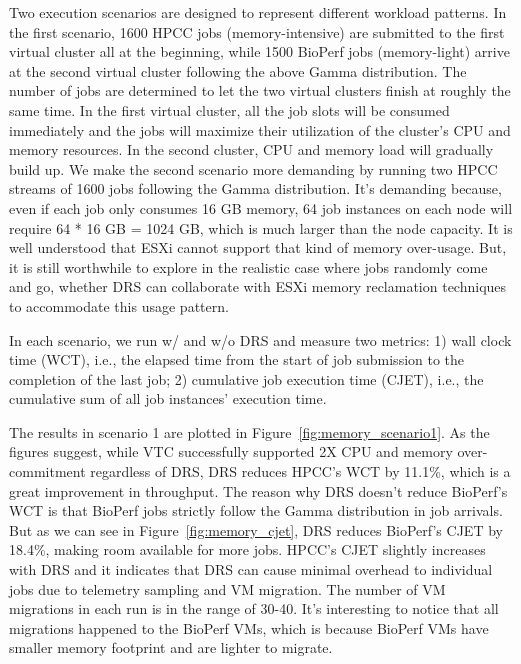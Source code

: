 Two execution scenarios are designed to represent different workload patterns. In the first scenario, 1600 HPCC jobs (memory-intensive) are submitted to the first virtual cluster all at the beginning, while 1500 BioPerf jobs (memory-light) arrive at the second virtual cluster following the above Gamma distribution. The number of jobs are determined to let the two virtual clusters finish at roughly the same time. In the first virtual cluster, all the job slots will be consumed immediately and the jobs will maximize their utilization of the cluster's CPU and memory resources. In the second cluster, CPU and memory load will gradually build up. 
We make the second scenario more demanding by running two HPCC streams of 1600 jobs following the Gamma distribution. 
It's demanding because, even if each job only consumes 16 GB memory, 64 job instances on each node will require 64 * 16 GB = 1024 GB, which is much larger than the node capacity. It is well understood that ESXi cannot support that kind of memory over-usage. But, it is still worthwhile to explore in the realistic case where jobs randomly come and go, whether DRS can collaborate with ESXi memory reclamation techniques to accommodate this usage pattern. 

In each scenario, we run w/ and w/o DRS and measure two metrics: 1) wall clock time (WCT), i.e., the elapsed time from the start of job submission to the completion of the last job; 2) cumulative job execution time (CJET), i.e., the cumulative sum of all job instances' execution time. 

The results in scenario 1 are plotted in Figure~\ref{fig:memory_scenario1}. As the figures suggest, while VTC successfully supported 2X CPU and memory over-commitment regardless of DRS, DRS reduces HPCC's WCT by 11.1\%, which is a great improvement in throughput. 
The reason why DRS doesn't reduce BioPerf's WCT is that BioPerf jobs strictly follow the Gamma distribution in job arrivals.
But as we can see in Figure~\ref{fig:memory_cjet}, DRS reduces BioPerf's CJET by 18.4\%, making room available for more jobs. HPCC's CJET slightly increases with DRS and it indicates that DRS can cause minimal overhead to individual jobs due to telemetry sampling and VM migration. 
The number of VM migrations in each run is in the range of 30-40. It's interesting to notice that all migrations happened to the BioPerf VMs, which is because BioPerf VMs have smaller memory footprint and are lighter to migrate.

